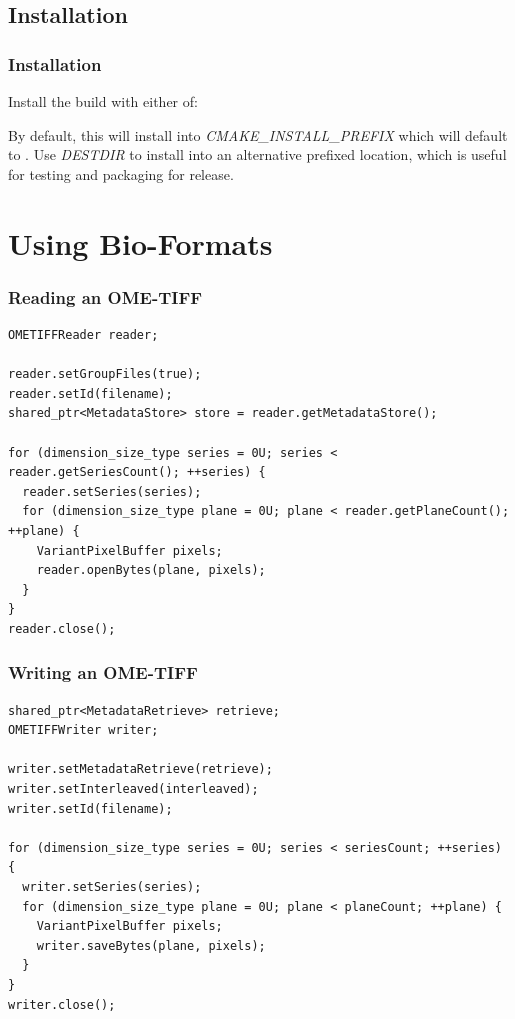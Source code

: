 \documentclass{beamer}
\newcommand{\opt}[1]{\textsl{#1}}
\begin{document}
\subsection{Installation}

\begin{frame}[fragile]
  \frametitle{Installation}
Install the build with either of:

  \begin{semiverbatim}
\end{semiverbatim}

By default, this will install into \opt{CMAKE\_INSTALL\_PREFIX} which
will default to .  Use \opt{DESTDIR} to install into
an alternative prefixed location, which is useful for testing and
packaging for release.
\end{frame}

\section{Using Bio-Formats}

\begin{frame}[fragile]
  \frametitle{Reading an OME-TIFF}
  \begin{lstlisting}
OMETIFFReader reader;

reader.setGroupFiles(true);
reader.setId(filename);
shared_ptr<MetadataStore> store = reader.getMetadataStore();

for (dimension_size_type series = 0U; series < reader.getSeriesCount(); ++series) {
  reader.setSeries(series);
  for (dimension_size_type plane = 0U; plane < reader.getPlaneCount(); ++plane) {
    VariantPixelBuffer pixels;
    reader.openBytes(plane, pixels);
  }
}
reader.close();
  \end{lstlisting}
\end{frame}

\begin{frame}[fragile]
  \frametitle{Writing an OME-TIFF}
  \begin{lstlisting}
shared_ptr<MetadataRetrieve> retrieve;
OMETIFFWriter writer;

writer.setMetadataRetrieve(retrieve);
writer.setInterleaved(interleaved);
writer.setId(filename);

for (dimension_size_type series = 0U; series < seriesCount; ++series) {
  writer.setSeries(series);
  for (dimension_size_type plane = 0U; plane < planeCount; ++plane) {
    VariantPixelBuffer pixels;
    writer.saveBytes(plane, pixels);
  }
}
writer.close();
  \end{lstlisting}
\end{frame}
\end{document}

